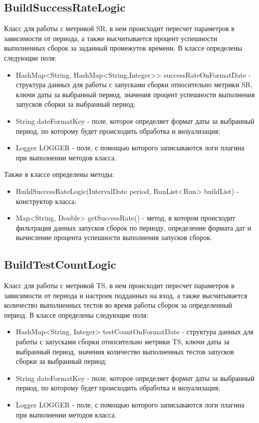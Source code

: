 \subsection{BuildSuccessRateLogic}

Класс для работы с метрикой SR, в нем происходит пересчет параметров в зависимости от периода, а также высчитывается процент успешности выполненных сборок за заданный промежуток времени. В классе определены следующие поля:

\begin{itemize}
	\item HashMap<String, HashMap<String,Integer>> successRateOnFormatDate - структура данных для работы с запусками сборки относительно метрики SR, ключи даты за выбранный период, значения процент успешности выполнения запусков сборки за выбранный период;
	\item String dateFormatKey - поле, которое определяет формат даты за выбранный период, по которому будет происходить обработка и визуализация;
	\item Logger LOGGER - поле, с помощью которого записываются логи плагина при выполнении методов класса.
\end{itemize}

Также в классе определены методы:

\begin{itemize}
	\item BuildSuccessRateLogic(IntervalDate period, RunList<Run> buildList) - конструктор класса;
	\item Map<String, Double> getSuccessRate() - метод, в котором происходит фильтрация данных запусков сборок по периоду, определение формата дат и вычисление процента успешности выполнения запусков сборок.
\end{itemize}

\subsection{BuildTestCountLogic}

Класс для работы с метрикой TS, в нем происходит пересчет параметров в зависимости от периода и настроек подданных на вход, а также высчитывается количество выполненных тестов во время работы сборок за определенный период. В классе определены следующие поля:

\begin{itemize}
	\item HashMap<String, Integer> testCountOnFormatDate - структура данных для работы с запусками сборки относительно метрики TS, ключи даты за выбранный период, значения количество выполненных тестов запусков сборки за выбранный период;
	\item String dateFormatKey - поле, которое определяет формат даты за выбранный период, по которому будет происходить обработка и визуализация;
	\item Logger LOGGER - поле, с помощью которого записываются логи плагина при выполнении методов класса.
\end{itemize}


